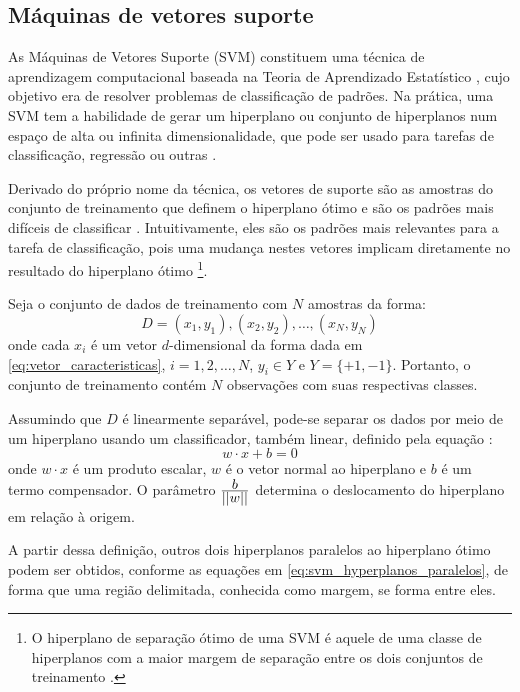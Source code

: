 \subsection{Máquinas de vetores suporte}
\label{sec:clasificadores_svm}
As Máquinas de Vetores Suporte (SVM) constituem uma técnica de aprendizagem computacional baseada na Teoria de Aprendizado Estatístico \citep{vapnik:13}, cujo objetivo era de resolver problemas de classificação de padrões. Na prática, uma SVM tem a habilidade de gerar um hiperplano ou conjunto de hiperplanos num espaço de alta ou infinita dimensionalidade, que pode ser usado para tarefas de classificação, regressão ou outras \citep{duda:12}.

Derivado do próprio nome da técnica, os vetores de suporte são as amostras do conjunto de treinamento que definem o hiperplano ótimo e são os padrões mais difíceis de classificar \citep{duda:12}. Intuitivamente, eles são os padrões mais relevantes para a tarefa de classificação, pois uma mudança nestes vetores implicam diretamente no resultado do hiperplano ótimo \footnote{O hiperplano de separação ótimo de uma SVM é aquele de uma classe de hiperplanos com a maior margem de separação entre os dois conjuntos de treinamento \citep{cortes:95}.}.

Seja o conjunto de dados de treinamento com $N$ amostras da forma:
\begin{equation}
\label{eq:svm_dataset}
    D = (x_1, y_1), (x_2, y_2), \ldots, (x_N, y_N)
\end{equation}
\noindent onde cada $x_i$ é um vetor $d$-dimensional da forma dada em \ref{eq:vetor_caracteristicas}, $i = 1, 2, \ldots, N$, $y_i \in Y$ e $Y = \{+1, -1\}$. Portanto, o conjunto de treinamento contém $N$ observações com suas respectivas classes.

Assumindo que $D$ é linearmente separável, pode-se separar os dados por meio de um hiperplano usando um classificador, também linear, definido pela equação \citep{lorena:03}:
\begin{equation}
\label{eq:svm_hyperplano_otimo}
w \cdot x + b = 0
\end{equation}
\noindent onde $w \cdot x$ é um produto escalar, $w$ é o vetor normal ao hiperplano e $b$ é um termo compensador. O parâmetro $\frac{\displaystyle b}{\displaystyle ||w||}$ determina o deslocamento do hiperplano em relação à origem.

A partir dessa definição, outros dois hiperplanos paralelos ao hiperplano ótimo podem ser obtidos, conforme as equações em \ref{eq:svm_hyperplanos_paralelos}, de forma que uma região delimitada, conhecida como margem, se forma entre eles.

